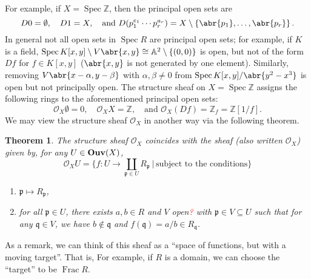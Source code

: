 \documentclass[11pt,leqno]{article}
\newcommand{\sai}[1]{\textcolor{red}{#1}}
\theoremstyle{plain}
\newtheorem{theorem}[lem]{Theorem}
\theoremstyle{definition}
\numberwithin{equation}{section}
\numberwithin{lem}{section}
\newcommand{\cbr}[1]{\left\{#1\right\}}
\DeclareMathOperator{\Spec}{Spec}
\DeclareMathOperator{\Frac}{Frac}
\newcommand{\catname}[1]{{\normalfont\mathbf{#1}}}
\newcommand{\Ouv}{\catname{Ouv}}
\begin{document}
For example, if $X = \Spec \mathbb Z$, then the principal open sets are
\begin{equation}
    D0 = \emptyset,\quad D1 = X,\quad\text{and }D(p_1^{e_1}\cdots p_r^{a_r}) = X\setminus\cbr{\abr{p_1},\dots,\abr{p_r}}.
\end{equation}
In general not all open sets in $\Spec R$ are principal open sets; for example, if $K$ is a field, $\Spec K[x,y]\setminus V\abr{x,y}\cong \mathbb A^2\setminus \cbr{(0,0)}$ is open, but not of the form $Df$ for $f\in K[x,y]$ ($\abr{x,y}$ is not generated by one element). Similarly, removing $V\abr{x-\alpha,y-\beta}$ with $\alpha,\beta\neq 0$ from $\Spec K[x,y]/\abr{y^2-x^3}$ is open but not principally open. The structure sheaf on $X = \Spec\mathbb Z$ assigns the following rings to the aforementioned principal open sets:
\begin{equation}
    \mathscr O_X\emptyset = 0,\quad \mathscr O_XX = \mathbb Z,\quad \text{and }\mathscr O_X(Df) = \mathbb Z_f = \mathbb Z[1/f].
\end{equation}
We may view the structure sheaf $\mathscr O_X$ in another way via the following theorem.
\begin{theorem}
    The structure sheaf $\mathscr O_X$ coincides with the sheaf (also written $\mathscr O_X$) given by, for any $U\in\Ouv(X)$,
    \begin{equation}
        \mathscr O_XU = \bigg\{f\colon U\to \coprod_{\mathfrak p\in U}R_{\mathfrak p}~\bigg\vert\, \text{subject to the conditions}\bigg\}
    \end{equation}
    \begin{enumerate}
        \item $\mathfrak p\mapsto R_{\mathfrak p}$,
        \item for all $\mathfrak p\in U$, there exists $a,b\in R$ and $V$ open\sai{?} with $\mathfrak p\in V\subseteq U$ such that for any $\mathfrak q\in V$, we have $b\not\in \mathfrak q$ and $f(\mathfrak q) = a/b\in R_{\mathfrak q}$.
    \end{enumerate}
\end{theorem}
As a remark, we can think of this sheaf as a ``space of functions, but with a moving target''. That is, 
For example, if $R$ is a domain, we can choose the ``target'' to be $\Frac R$.

\newpage
\printindex\newpage
\begin{bibdiv}
\begin{biblist}



\end{biblist}
\end{bibdiv}
\end{document}

